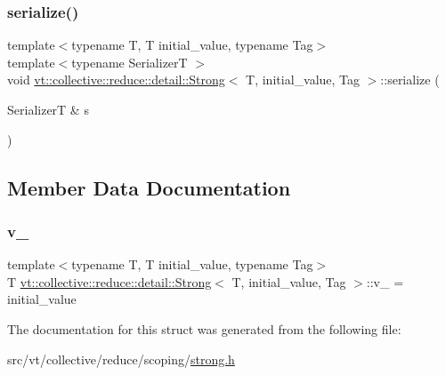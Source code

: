 \subsubsection{\texorpdfstring{serialize()}{serialize()}}
{\footnotesize\ttfamily template$<$typename T, T initial\+\_\+value, typename Tag$>$ \\
template$<$typename SerializerT $>$ \\
void \hyperlink{structvt_1_1collective_1_1reduce_1_1detail_1_1_strong}{vt\+::collective\+::reduce\+::detail\+::\+Strong}$<$ T, initial\+\_\+value, Tag $>$\+::serialize (\begin{DoxyParamCaption}\item[{SerializerT \&}]{s }\end{DoxyParamCaption})\hspace{0.3cm}{\ttfamily [inline]}}



\subsection{Member Data Documentation}
\mbox{\label{structvt_1_1collective_1_1reduce_1_1detail_1_1_strong_a1952e524a596e85011084327aacff707}} 
\subsubsection{\texorpdfstring{v\+\_\+}{v\_}}
{\footnotesize\ttfamily template$<$typename T, T initial\+\_\+value, typename Tag$>$ \\
T \hyperlink{structvt_1_1collective_1_1reduce_1_1detail_1_1_strong}{vt\+::collective\+::reduce\+::detail\+::\+Strong}$<$ T, initial\+\_\+value, Tag $>$\+::v\+\_\+ = initial\+\_\+value\hspace{0.3cm}{\ttfamily [private]}}



The documentation for this struct was generated from the following file\+:\begin{DoxyCompactItemize}
\item 
src/vt/collective/reduce/scoping/\hyperlink{strong_8h}{strong.\+h}\end{DoxyCompactItemize}
